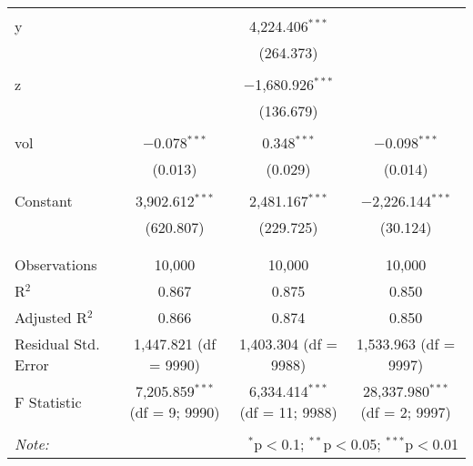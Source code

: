 \begin{tabular}{@{\extracolsep{5pt}}lccc}
  & & & \\ 
 y &  & 4,224.406$^{***}$ &  \\ 
  &  & (264.373) &  \\ 
  & & & \\ 
 z &  & $-$1,680.926$^{***}$ &  \\ 
  &  & (136.679) &  \\ 
  & & & \\ 
 vol & $-$0.078$^{***}$ & 0.348$^{***}$ & $-$0.098$^{***}$ \\ 
  & (0.013) & (0.029) & (0.014) \\ 
  & & & \\ 
 Constant & 3,902.612$^{***}$ & 2,481.167$^{***}$ & $-$2,226.144$^{***}$ \\ 
  & (620.807) & (229.725) & (30.124) \\ 
  & & & \\ 
\hline \\[-1.8ex] 
Observations & 10,000 & 10,000 & 10,000 \\ 
R$^{2}$ & 0.867 & 0.875 & 0.850 \\ 
Adjusted R$^{2}$ & 0.866 & 0.874 & 0.850 \\ 
Residual Std. Error & 1,447.821 (df = 9990) & 1,403.304 (df = 9988) & 1,533.963 (df = 9997) \\ 
F Statistic & 7,205.859$^{***}$ (df = 9; 9990) & 6,334.414$^{***}$ (df = 11; 9988) & 28,337.980$^{***}$ (df = 2; 9997) \\ 
\hline 
\hline \\[-1.8ex] 
\textit{Note:}  & \multicolumn{3}{r}{$^{*}$p$<$0.1; $^{**}$p$<$0.05; $^{***}$p$<$0.01} \\ 
\end{tabular} 
